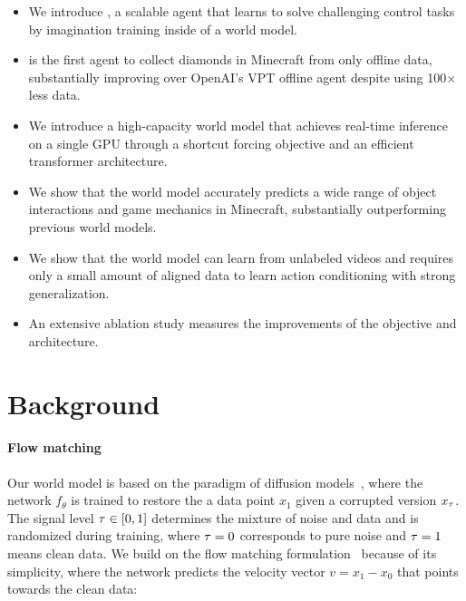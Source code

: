 \documentclass[11pt]{article}
\begin{document}
\begin{itemize}
\item We introduce \method, a scalable agent that learns to solve challenging control tasks by imagination training inside of a world model.
\item \method is the first agent to collect diamonds in Minecraft from only offline data, substantially improving over OpenAI's VPT offline agent\citep{vpt} despite using 100$\times$ less data.
\item We introduce a high-capacity world model that achieves real-time inference on a single GPU through a shortcut forcing objective and an efficient transformer architecture.
\item We show that the world model accurately predicts a wide range of object interactions and game mechanics in Minecraft, substantially outperforming previous world models.
\item We show that the world model can learn from unlabeled videos and requires only a small amount of aligned data to learn action conditioning with strong generalization.
\item An extensive ablation study measures the improvements of the objective and architecture.
\end{itemize}

\section{Background}
\label{sec:background}

\paragraph{Flow matching}

Our world model is based on the paradigm of diffusion models~\citep{sohl2015deep,ddpm}, where the network $f_\theta$ is trained to restore the a data point $x_1$ given a corrupted version $x_\tau$.
The signal level $\tau \in [0, 1]$ determines the mixture of noise and data and is randomized during training, where $\tau=0$ corresponds to pure noise and $\tau=1$ means clean data.
We build on the flow matching formulation~\citep{flowmatching,rectifiedflow} because of its simplicity, where the network predicts the velocity vector $v = x_1 - x_0$ that points towards the clean data:

\end{document}
